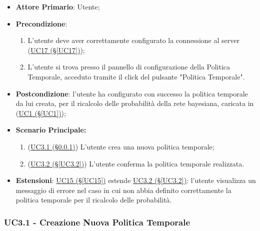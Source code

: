 \begin{itemize}
	\item \textbf{Attore Primario}: Utente;
	\item \textbf{Precondizione}:
		\begin{enumerate}
			\item L'utente deve aver correttamente configurato la connessione al server (\hyperref[UC17]{UC17 (§\ref*{UC17})});
			\item L'utente si trova presso il pannello di configurazione della Politica Temporale, acceduto tramite il click del pulsante "Politica Temporale".
		\end{enumerate}
	\item \textbf{Postcondizione}: l'utente ha configurato con successo la politica temporale da lui creata, per il ricalcolo delle probabilità della rete bayesiana, caricata in (\hyperref[UC1]{UC1 (§\ref*{UC1})});
	\item \textbf{Scenario Principale:}
	\begin{enumerate}
		\item (\hyperref[UC3.1]{UC3.1 (§\ref*{UC3.1})}) L'utente crea una nuova politica temporale;
		\item (\hyperref[UC3.2]{UC3.2 (§\ref*{UC3.2})}) L'utente conferma la politica temporale realizzata.
	\end{enumerate}
	\item \textbf{Estensioni}: \hyperref[UC15]{UC15 (§\ref*{UC15})} estende \hyperref[UC3.2]{UC3.2 (§\ref*{UC3.2})}: l'utente visualizza un messaggio di errore nel caso in cui non abbia definito correttamente la politica temporale per il ricalcolo delle probabilità.
\end{itemize}

\pagebreak

\subsubsection{UC3.1 - Creazione Nuova Politica Temporale}\label{UC3.1}


